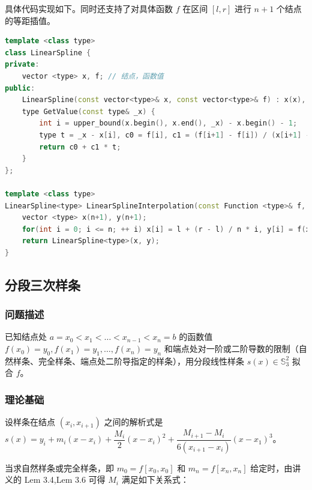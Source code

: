 \documentclass{ctexart}
\begin{document}
具体代码实现如下。同时还支持了对具体函数 $f$ 在区间 $[l,r]$ 进行 $n+1$ 个结点的等距插值。
\begin{lstlisting}[language={c++}]
template <class type>
class LinearSpline {
private:
	vector <type> x, f;	// 结点，函数值
public:
	LinearSpline(const vector<type>& x, const vector<type>& f) : x(x), f(f) {}
	type GetValue(const type& _x) {
		int i = upper_bound(x.begin(), x.end(), _x) - x.begin() - 1;
		type t = _x - x[i], c0 = f[i], c1 = (f[i+1] - f[i]) / (x[i+1] - x[i]);
		return c0 + c1 * t;
	}
};

template <class type>
LinearSpline<type> LinearSplineInterpolation(const Function <type>& f, const type& l, const type& r, const int& n) {
	vector <type> x(n+1), y(n+1);
	for(int i = 0; i <= n; ++ i) x[i] = l + (r - l) / n * i, y[i] = f(x[i]);
	return LinearSpline<type>(x, y);
}
\end{lstlisting}

\subsection{分段三次样条}

\subsubsection{问题描述}

已知结点处 $a=x_0<x_1<\dots<x_{n-1}<x_n=b$ 的函数值 $f(x_0)=y_0,f(x_1)=y_1,\dots,f(x_n)=y_n$ 和端点处对一阶或二阶导数的限制（自然样条、完全样条、端点处二阶导指定的样条），用分段线性样条 $s(x)\in \mathbb{S}_3^2$ 拟合 $f$。

\subsubsection{理论基础}

设样条在结点 $(x_i,x_{i+1})$ 之间的解析式是 $s(x)=y_i+m_i(x-x_i)+\dfrac{M_i}2(x-x_i)^2+\dfrac{M_{i+1}-M_i}{6(x_{i+1}-x_i)}(x-x_1)^3$。

当求自然样条或完全样条，即 $m_0=f[x_0,x_0]$ 和 $m_n=f[x_n,x_n]$ 给定时，由讲义的 Lem 3.4,Lem 3.6 可得 $M_i$ 满足如下关系式：
\end{document}
